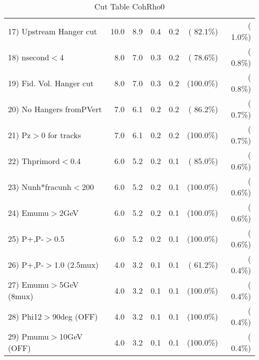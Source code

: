 \begin{table}[h!]
\begin{tabular}{||l||r|r|r|r|r|r||}
 17) Upstream Hanger cut  &         10.0 &          8.9 &          0.4 &          0.2 & ( 82.1\%) & (  1.0\%) \\
 18) nsecond$<$4          &          8.0 &          7.0 &          0.3 &          0.2 & ( 78.6\%) & (  0.8\%) \\
 19) Fid. Vol. Hanger cut &          8.0 &          7.0 &          0.3 &          0.2 & (100.0\%) & (  0.8\%) \\
 20) No Hangers fromPVert &          7.0 &          6.1 &          0.2 &          0.2 & ( 86.2\%) & (  0.7\%) \\
 21) Pz$>$0 for tracks    &          7.0 &          6.1 &          0.2 &          0.2 & (100.0\%) & (  0.7\%) \\
 22) Thprimord$<$0.4      &          6.0 &          5.2 &          0.2 &          0.1 & ( 85.0\%) & (  0.6\%) \\
 23) Nunh*fracunh$<$200   &          6.0 &          5.2 &          0.2 &          0.1 & (100.0\%) & (  0.6\%) \\
 24) Emumu$>$2GeV         &          6.0 &          5.2 &          0.2 &          0.1 & (100.0\%) & (  0.6\%) \\
 25) P+,P-$>$0.5          &          6.0 &          5.2 &          0.2 &          0.1 & (100.0\%) & (  0.6\%) \\
 26) P+,P-$>$1.0 (2.5mux) &          4.0 &          3.2 &          0.1 &          0.1 & ( 61.2\%) & (  0.4\%) \\
 27) Emumu$>$5GeV  (8mux) &          4.0 &          3.2 &          0.1 &          0.1 & (100.0\%) & (  0.4\%) \\
 28) Phi12$>$90deg  (OFF) &          4.0 &          3.2 &          0.1 &          0.1 & (100.0\%) & (  0.4\%) \\
 29) Pmumu$>$10GeV  (OFF) &          4.0 &          3.2 &          0.1 &          0.1 & (100.0\%) & (  0.4\%) \\
 \hline
 \hline
 \end{tabular}
 \caption{Cut Table  CohRho0  }
 \label{tab-cutcohjpsi-mumu_cohrho0}
 \end{table}

